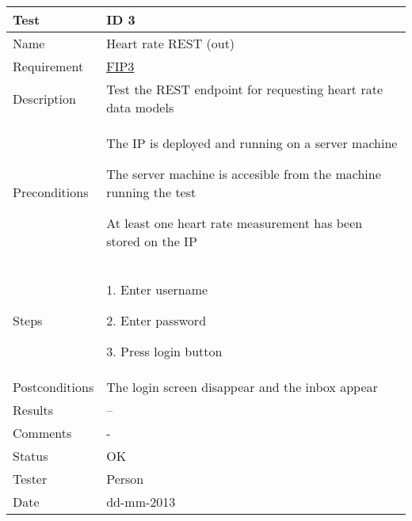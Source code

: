 \begin{table}
\begin{center}
\begin{tabular}{ | l | p{10cm} | }
	\hline
	\textbf{Test}	&	\textbf{ID 3} \\
	\hline\noalign{\smallskip}\noalign{\smallskip}\hline
	Name				& Heart rate REST (out) \\
	Requirement			& \hyperref[table:reqip]{FIP3} \\
	Description			& Test the REST endpoint for requesting heart rate data models \\
	Preconditions		&	\par The IP is deployed and running on a server machine
							\par The server machine is accesible from the machine running the test
							\par At least one heart rate measurement has been stored on the IP \\
	Steps 				&	\par 1. Enter username
							\par 2. Enter password
							\par 3. Press login button \\
	Postconditions		& The login screen disappear and the inbox appear \\
	Results				& -- \\
	Comments			& - \\
	Status				& OK \\
	Tester				& Person \\
	Date				& dd-mm-2013 \\
	\hline
\end{tabular}
\end{center}
\end{table}


